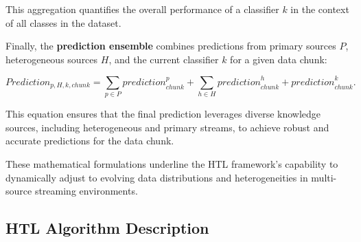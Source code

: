 This aggregation quantifies the overall performance of a classifier \(k\) in the context of all classes in the dataset.

Finally, the \textbf{prediction ensemble} combines predictions from primary sources \(P\), heterogeneous sources \(H\), and the current classifier \(k\) for a given data chunk:

\begin{equation}
\label{eq:6_eq_3}
{Prediction}_{p,H,k,chunk} = \sum_{p \in P} {{prediction}^{p}_{chunk}} + \sum_{h \in H} {{prediction}^{h}_{chunk}} + {prediction}^{k}_{chunk}.
\end{equation}

This equation ensures that the final prediction leverages diverse knowledge sources, including heterogeneous and primary streams, to achieve robust and accurate predictions for the data chunk.

These mathematical formulations underline the HTL framework's capability to dynamically adjust to evolving data distributions and heterogeneities in multi-source streaming environments.

\subsection{HTL Algorithm Description}

